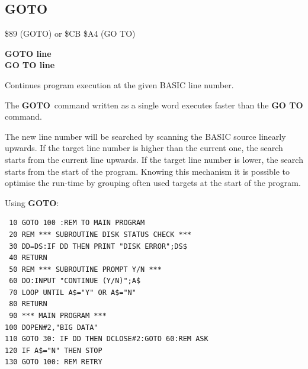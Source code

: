 
\newpage
\subsection{GOTO}
\begin{description}[leftmargin=2cm,style=nextline]
\item [Token:] \$89 (GOTO) or \$CB \$A4 (GO TO)
\item [Format:] {\bf GOTO line} \\
                {\bf GO TO line}
\item [Usage:] Continues program
               execution at the given BASIC line number.

               The {\bf GOTO} command written as a single
               word executes faster than the {\bf GO TO} command.

\item [Remarks:] The new line number will be searched by scanning
               the BASIC source linearly upwards. If the target
               line number is higher than the current one, the
               search starts from the current line upwards.
               If the target line number is lower, the search starts
               from the start of the program.
               Knowing this mechanism it is possible to optimise
               the run-time by grouping often used targets at the
               start of the program.

\item [Example:] Using {\bf GOTO}:
\begin{tcolorbox}[colback=black,coltext=white]
\verbatimfont{\codefont}
\begin{verbatim}
 10 GOTO 100 :REM TO MAIN PROGRAM
 20 REM *** SUBROUTINE DISK STATUS CHECK ***
 30 DD=DS:IF DD THEN PRINT "DISK ERROR";DS$
 40 RETURN
 50 REM *** SUBROUTINE PROMPT Y/N ***
 60 DO:INPUT "CONTINUE (Y/N)";A$
 70 LOOP UNTIL A$="Y" OR A$="N"
 80 RETURN
 90 *** MAIN PROGRAM ***
100 DOPEN#2,"BIG DATA"
110 GOTO 30: IF DD THEN DCLOSE#2:GOTO 60:REM ASK
120 IF A$="N" THEN STOP
130 GOTO 100: REM RETRY
\end{verbatim}
\end{tcolorbox}
\end{description}


\newpage
